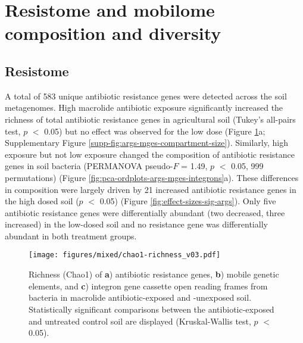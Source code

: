 \section{Resistome and mobilome composition and diversity}

\subsection{Resistome}

A total of 583 unique antibiotic resistance genes were detected across the soil metagenomes.
High macrolide antibiotic exposure significantly increased the richness of total antibiotic resistance genes in agricultural soil (Tukey’s all-pairs test, $p$ $<$ 0.05) but no effect was observed for the low dose (Figure \ref{fig:chao1-richness}a; Supplementary Figure \ref{supp-fig:args-mges-compartment-size}).
Similarly, high exposure but not low exposure changed the composition of antibiotic resistance genes in soil bacteria (PERMANOVA pseudo-$F$ = 1.49, $p$ $<$ 0.05, 999 permutations) (Figure \ref{fig:pca-ordplots-args-mges-integrons}a).
These differences in composition were largely driven by 21 increased antibiotic resistance genes in the high dosed soil ($p$ $<$ 0.05) (Figure \ref{fig:effect-sizes-sig-args}).
Only five antibiotic resistance genes were differentially abundant (two decreased, three increased) in the low-dosed soil and no resistance gene was differentially abundant in both treatment groups.

\begin{figure}[htpb]
	\centering
		\texttt{[image: figures/mixed/chao1-richness\_v03.pdf]}
	\caption[Richness of antibiotic resistance genes, mobile genetic elements, and integron gene cassette open reading frames.]{
		Richness (Chao1) of \textbf{a}) antibiotic resistance genes, \textbf{b}) mobile genetic elements, and \textbf{c}) integron gene cassette open reading frames from bacteria in macrolide antibiotic-exposed and -unexposed soil.
		Statistically significant comparisons between the antibiotic-exposed and untreated control soil are displayed (Kruskal-Wallis test, $p$ $<$ 0.05).
	}
	\label{fig:chao1-richness}
\end{figure}

